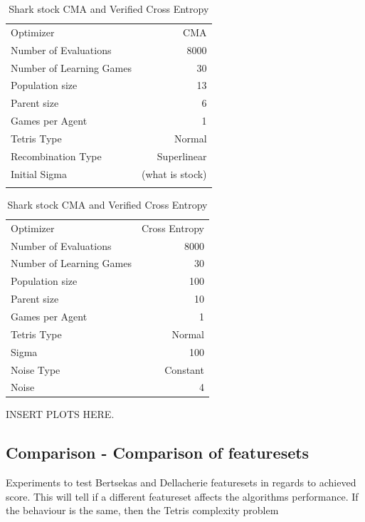 \begin{table}[h]
\centering
\small
\caption{Shark stock CMA and Verified Cross Entropy}
\begin{tabular}{l r}
Optimizer & CMA\\
Number of Evaluations & 8000\\
Number of Learning Games & 30\\
Population size& 13\\
Parent size & 6\\
Games per Agent & 1\\
Tetris Type & Normal\\
\hline
Recombination Type & Superlinear\\
Initial Sigma & (what is stock)\\
\quad & \quad
\end{tabular}
\quad
\begin{tabular}{l r}
Optimizer & Cross Entropy\\
Number of Evaluations & 8000\\
Number of Learning Games & 30\\
Population size & 100\\
Parent size & 10\\
Games per Agent & 1\\
Tetris Type & Normal\\
\hline
Sigma & 100\\
Noise Type & Constant\\
Noise & 4
\end{tabular}
\end{table}

INSERT PLOTS HERE.

\clearpage

\subsection{Comparison - Comparison of featuresets}
Experiments to test Bertsekas and Dellacherie featuresets in regards to achieved score. This will tell if a different featureset affects the algorithms performance. If the behaviour is the same, then the Tetris complexity problem

